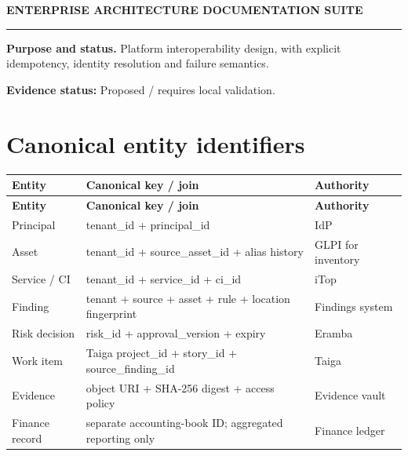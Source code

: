 \documentclass[10pt,letterpaper]{article}
\begin{document}
\begin{center}
{\large\bfseries\color{teal} ENTERPRISE ARCHITECTURE DOCUMENTATION SUITE}\par
{}\par
{}\par
\end{center}
\vspace{8pt}\hrule\vspace{12pt}
\textbf{Purpose and status.} Platform interoperability design, with explicit idempotency, identity resolution and failure semantics.\par
\textbf{Evidence status:} Proposed / requires local validation.\par
\section{Canonical entity identifiers}
\small\begin{longtable}{>{\raggedright\arraybackslash}p{}>{\raggedright\arraybackslash}p{}>{\raggedright\arraybackslash}p{}}
\toprule
\textbf{Entity} & \textbf{Canonical key / join} & \textbf{Authority}\\
\midrule\endfirsthead
\toprule
\textbf{Entity} & \textbf{Canonical key / join} & \textbf{Authority}\\
\midrule\endhead
Principal & tenant\_id + principal\_id & IdP\\
Asset & tenant\_id + source\_asset\_id + alias history & GLPI for inventory\\
Service / CI & tenant\_id + service\_id + ci\_id & iTop\\
Finding & tenant + source + asset + rule + location fingerprint & Findings system\\
Risk decision & risk\_id + approval\_version + expiry & Eramba\\
Work item & Taiga project\_id + story\_id + source\_finding\_id & Taiga\\
Evidence & object URI + SHA-256 digest + access policy & Evidence vault\\
Finance record & separate accounting-book ID; aggregated reporting only & Finance ledger\\
\bottomrule
\end{longtable}
\normalsize
\end{document}
